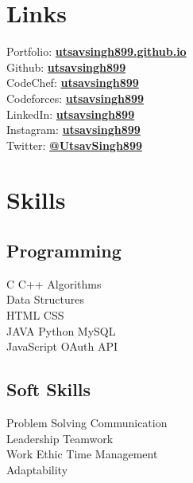 \documentclass[]{deedy-resume-openfont}
\begin{document}
\begin{minipage}[t]{0.33\textwidth}
\section{Links}
Portfolio: \href{https://utsavsingh899.github.io}{\bf utsavsingh899.github.io} \\
Github: \href{https://github.com/utsavsingh899}{\bf utsavsingh899} \\
CodeChef: \href{https://www.codechef.com/users/utsavsingh899}{\bf utsavsingh899} \\
Codeforces: \href{https://codeforces.com/profile/utsavsingh899}{\bf utsavsingh899} \\
LinkedIn:  \href{https://www.linkedin.com/in/utsavsingh899}{\bf utsavsingh899} \\
Instagram: \href{https://instagram.com/utsavsingh899}{\bf utsavsingh899} \\
Twitter:  \href{https://twitter.com/UtsavSingh899}{\bf @UtsavSingh899} \\
\sectionsep

%
%

\section{Skills}
\subsection{Programming}
C \textbullet{} C++ \textbullet{} Algorithms \textbullet{} \\
Data Structures \textbullet{} \\
HTML \textbullet{} CSS \\
JAVA \textbullet{} Python \textbullet{} MySQL \textbullet{} \\
JavaScript \textbullet{} OAuth API \\
\sectionsep

\subsection{Soft Skills}
Problem Solving \textbullet{} Communication \textbullet{} \\
Leadership \textbullet{} Teamwork \textbullet{} \\
Work Ethic \textbullet{} Time Management \textbullet{} \\
Adaptability \\
\sectionsep


\end{minipage}
\end{document}
